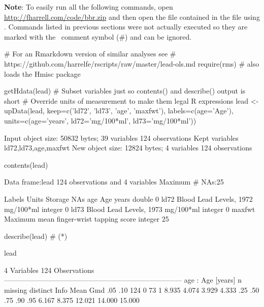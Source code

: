 \textbf{Note}: To easily run all the following commands, open \ipacue
\url{http://fharrell.com/code/bbr.zip}
and then open the file  contained in the 
file using .  Commands listed in previous sections were
not actually executed so they are marked with the \R\ comment symbol
(\#) and can be ignored.

\begin{Schunk}
\begin{Sinput}
# For an Rmarkdown version of similar analyses see
# https://github.com/harrelfe/rscripts/raw/master/lead-ols.md
require(rms)    # also loads the Hmisc package
\end{Sinput}
\begin{Sinput}
getHdata(lead)
# Subset variables just so contents() and describe() output is short
# Override units of measurement to make them legal R expressions
lead <- upData(lead,
               keep=c('ld72', 'ld73', 'age', 'maxfwt'),
               labels=c(age='Age'),
               units=c(age='years', ld72='mg/100*ml', ld73='mg/100*ml'))
\end{Sinput}
\begin{Soutput}
Input object size:	 50832 bytes;	 39 variables	 124 observations
Kept variables	ld72,ld73,age,maxfwt
New object size:	12824 bytes;	4 variables	124 observations
\end{Soutput}
\begin{Sinput}
contents(lead)
\end{Sinput}
\begin{Soutput}

Data frame:lead	124 observations and 4 variables    Maximum # NAs:25


                                        Labels     Units Storage NAs
age                                        Age     years  double   0
ld72                   Blood Lead Levels, 1972 mg/100*ml integer   0
ld73                   Blood Lead Levels, 1973 mg/100*ml integer   0
maxfwt Maximum mean finger-wrist tapping score           integer  25
\end{Soutput}
\begin{Sinput}
describe(lead)   # (*\ipacue*)
\end{Sinput}
\begin{Soutput}
lead 

 4  Variables      124  Observations
---------------------------------------------------------------------------
age : Age [years] 
       n  missing distinct     Info     Mean      Gmd      .05      .10 
     124        0       73        1    8.935    4.074    3.929    4.333 
     .25      .50      .75      .90      .95 
   6.167    8.375   12.021   14.000   15.000 


\end{Soutput}
\end{Schunk}
